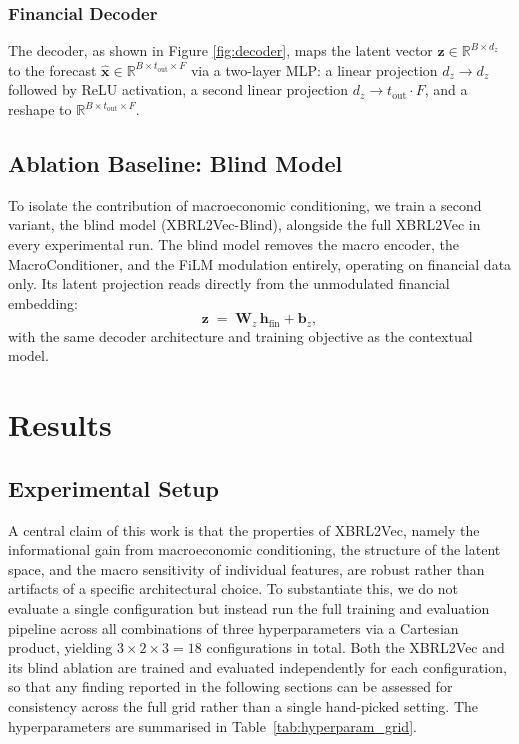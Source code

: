 \documentclass[a4paper,fleqn]{cas-dc}
\begin{document}
\subsubsection{Financial Decoder}
\label{ssec:decoder}

The decoder, as shown in Figure \ref{fig:decoder}, maps the latent vector $\textbf{z} \in \mathbb{R}^{B \times d_z}$ to the forecast $\hat{\textbf{x}} \in \mathbb{R}^{B \times t_{\mathrm{out}} \times F}$ via a two-layer MLP: a linear projection $d_z \to d_z$ followed by ReLU activation, a second linear projection $d_z \to t_{\mathrm{out}} \cdot F$, and a reshape to $\mathbb{R}^{B \times t_{\mathrm{out}} \times F}$.


\subsection{Ablation Baseline: Blind Model}
\label{ssec:blind}

To isolate the contribution of macroeconomic conditioning, we train a second variant, the blind model (XBRL2Vec-Blind), alongside the full XBRL2Vec in every experimental run.  The blind model removes the macro encoder, the MacroConditioner, and the FiLM modulation entirely, operating on financial data only.  Its latent projection reads directly from the unmodulated financial embedding:
\begin{equation}
  \textbf{z} \;=\; \mathbf{W}_z\, \textbf{h}_{\mathrm{fin}} + \mathbf{b}_z,
\end{equation}
with the same decoder architecture and training objective as the contextual model.

\section{Results} \label{sec:res}

\subsection{Experimental Setup}
A central claim of this work is that the properties of XBRL2Vec, namely the informational gain from macroeconomic conditioning, the structure of the latent space, and the macro sensitivity of individual features, are robust rather than artifacts of a specific architectural choice. To substantiate this, we do not evaluate a single configuration but instead run the full training and evaluation pipeline across all combinations of three hyperparameters via a Cartesian product, yielding $3 \times 2 \times 3 = 18$ configurations in total. Both the XBRL2Vec and its blind ablation are trained and evaluated independently for each configuration, so that any finding reported in the following sections can be assessed for consistency across the full grid rather than a single hand-picked setting. The hyperparameters are summarised in Table~\ref{tab:hyperparam_grid}.
\end{document}
